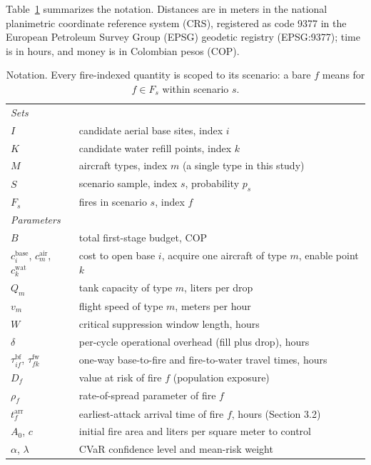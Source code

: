 \documentclass[11pt]{article}
\begin{document}
Table~\ref{tab:notation} summarizes the notation.
Distances are in meters in the national planimetric coordinate
reference system (CRS), registered as code 9377 in the European
Petroleum Survey Group (EPSG) geodetic registry (EPSG:9377); time is
in hours, and money is in Colombian pesos (COP).

\begin{table}[!htbp]
\centering
\caption{Notation. Every fire-indexed quantity is scoped to its
scenario: a bare $f$ means for $f \in F_s$ within scenario $s$.}
\label{tab:notation}
\small
\begin{tabular}{ll}
\toprule
\multicolumn{2}{l}{\emph{Sets}} \\
$I$ & candidate aerial base sites, index $i$ \\
$K$ & candidate water refill points, index $k$ \\
$M$ & aircraft types, index $m$ (a single type in this study) \\
$S$ & scenario sample, index $s$, probability $p_s$ \\
$F_s$ & fires in scenario $s$, index $f$ \\
\midrule
\multicolumn{2}{l}{\emph{Parameters}} \\
$B$ & total first-stage budget, COP \\
$c^{\mathrm{base}}_i$, $c^{\mathrm{air}}_m$, $c^{\mathrm{wat}}_k$ &
cost to open base $i$, acquire one aircraft of type $m$, enable point $k$ \\
$Q_m$ & tank capacity of type $m$, liters per drop \\
$v_m$ & flight speed of type $m$, meters per hour \\
$W$ & critical suppression window length, hours \\
$\delta$ & per-cycle operational overhead (fill plus drop), hours \\
$\tau^{\mathrm{bf}}_{if}$, $\tau^{\mathrm{fw}}_{fk}$ &
one-way base-to-fire and fire-to-water travel times, hours \\
$D_f$ & value at risk of fire $f$ (population exposure) \\
$\rho_f$ & rate-of-spread parameter of fire $f$ \\
$t^{\mathrm{arr}}_f$ & earliest-attack arrival time of fire $f$, hours (Section 3.2) \\
$A_0$, $c$ & initial fire area and liters per square meter to control \\
$\alpha$, $\lambda$ & CVaR confidence level and mean-risk weight \\

\end{tabular}
\end{table}
\end{document}
